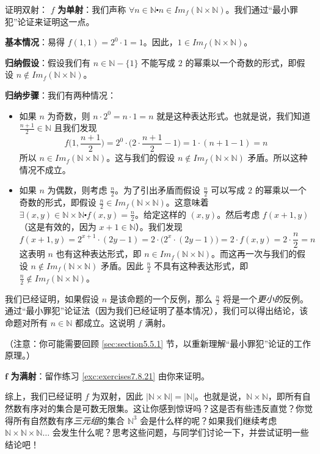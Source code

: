 \begin{example}
\begin{proofs}{证明双射：}
        $f$ \textbf{为单射}：我们声称 $\forall n \in \mathbb{N} \centerdot n \in Im_f (\mathbb{N} \times \mathbb{N})$。我们通过``最小罪犯''论证来证明这一点。

        \textbf{基本情况}：易得 $f(1, 1) = 2^0 \cdot 1 = 1$。因此，$1 \in Im_f (\mathbb{N} \times \mathbb{N})$。

        \textbf{归纳假设}：假设我们有 $n \in \mathbb{N} - \{1\}$ 不能写成 $2$ 的幂乘以一个奇数的形式，即假设 $n \notin Im_f (\mathbb{N} \times \mathbb{N})$。

        \textbf{归纳步骤}：我们有两种情况：
        \begin{itemize}
            \item 如果 $n$ 为奇数，则 $n \cdot 2^0 = n \cdot 1 = n$ 就是这种表达形式。也就是说，我们知道 $\frac{n+1}{2} \in \mathbb{N}$ 且我们发现
                  \[f\Big(1, \frac{n+1}{2}\Big) = 2^0 \cdot \Big(2 \cdot \frac{n+1}{2}-1\Big) = 1 \cdot (n + 1 - 1) = n\]
                  所以 $n \in Im_f (\mathbb{N} \times \mathbb{N})$。这与我们的假设 $n \notin Im_f (\mathbb{N} \times \mathbb{N})$ 矛盾。所以这种情况不成立。
            \item 如果 $n$ 为偶数，则考虑 $\frac{n}{2}$。为了引出矛盾而假设 $\frac{n}{2}$ 可以写成 $2$ 的幂乘以一个奇数的形式，即假设 $\frac{n}{2} \in Im_f (\mathbb{N} \times \mathbb{N})$。这意味着 $\exists (x, y) \in \mathbb{N} \times \mathbb{N} \centerdot f(x, y) = \frac{n}{2}$。给定这样的 $(x,y)$。然后考虑 $f(x + 1, y)$（这是有效的，因为 $x+1 \in \mathbb{N}$）。我们发现
                  \[f(x + 1, y) = 2^{x+1} \cdot (2y - 1) = 2 \cdot \big(2^x \cdot (2y - 1)\big) =  2 \cdot f(x, y) = 2 \cdot \frac{n}{2} = n\]
                  这表明 $n$ 也有这种表达形式，即 $n \in Im_f (\mathbb{N} \times \mathbb{N})$。而这再一次与我们的假设 $n \notin Im_f (\mathbb{N} \times \mathbb{N})$ 矛盾。因此 $\frac{n}{2}$ 不具有这种表达形式，即 $\frac{n}{2} \notin Im_f (\mathbb{N} \times \mathbb{N})$。
        \end{itemize}

        我们已经证明，如果假设 $n$ 是该命题的一个反例，那么 $\frac{n}{2}$ 将是一个\emph{更小的}反例。通过``最小罪犯''论证法（因为我们已经证明了基本情况），我们可以得出结论，该命题对所有 $n \in \mathbb{N}$ 都成立。这说明 $f$ 满射。
    \end{proofs}

    （注意：你可能需要回顾 \ref{sec:section5.5.1} 节，以重新理解``最小罪犯''论证的工作原理。）

    $\mathbf{f}$ \textbf{为满射}：留作练习 \ref{exc:exercises7.8.21} 由你来证明。

    综上，我们已经证明 $f$ 为双射，因此 $|\mathbb{N} \times \mathbb{N}| = |\mathbb{N}|$。也就是说，$\mathbb{N} \times \mathbb{N}$，即所有自然数有序对的集合是可数无限集。这让你感到惊讶吗？这是否有些违反直觉？你觉得所有自然数有序\emph{三元组}的集合 $\mathbb{N}^3$ 会是什么样的呢？如果我们继续考虑 $\mathbb{N} \times \mathbb{N} \times \mathbb{N} \dots$ 会发生什么呢？思考这些问题，与同学们讨论一下，并尝试证明一些结论吧！
\end{example}

